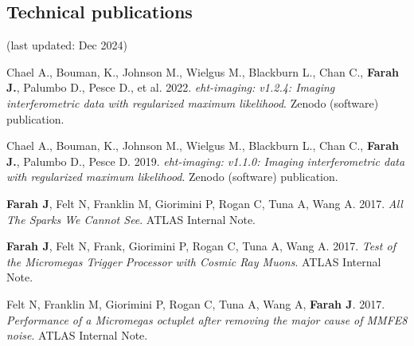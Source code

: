\documentclass[margin,line]{res}
\begin{document}
\begin{resume}
\vspace{+.4cm}
\section{\sc Technical publications}
(last updated: Dec 2024)

Chael A., Bouman, K., Johnson  M., Wielgus M., Blackburn L., Chan C., \textbf{Farah J.}, Palumbo D., Pesce D., et al. 2022. \textit{eht-imaging: v1.2.4: Imaging interferometric data with regularized maximum likelihood}. Zenodo (software) publication.

Chael A., Bouman, K., Johnson  M., Wielgus M., Blackburn L., Chan C., \textbf{Farah J.}, Palumbo D., Pesce D. 2019. \textit{eht-imaging: v1.1.0: Imaging interferometric data with regularized maximum likelihood}. Zenodo (software) publication.

\textbf{Farah J}, Felt N, Franklin M, Giorimini P, Rogan C, Tuna A, Wang A. 2017. \textit{All The Sparks We Cannot See}. ATLAS Internal Note.

\textbf{Farah J}, Felt N, Frank, Giorimini P, Rogan C, Tuna A, Wang A. 2017. \textit{Test of the Micromegas Trigger Processor with Cosmic Ray Muons}. ATLAS Internal Note.

Felt N, Franklin M, Giorimini P, Rogan C, Tuna A, Wang A, \textbf{Farah J}. 2017. \textit{Performance of a Micromegas octuplet after removing the major cause of MMFE8 noise}. ATLAS Internal Note.

\vspace{+.4cm}

\end{resume}
\end{document}
